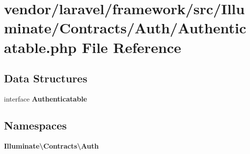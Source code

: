 \section{vendor/laravel/framework/src/\+Illuminate/\+Contracts/\+Auth/\+Authenticatable.php File Reference}
\label{_contracts_2_auth_2_authenticatable_8php}
\subsection*{Data Structures}
\begin{DoxyCompactItemize}
\item 
interface {\bf Authenticatable}
\end{DoxyCompactItemize}
\subsection*{Namespaces}
\begin{DoxyCompactItemize}
\item 
 {\bf Illuminate\textbackslash{}\+Contracts\textbackslash{}\+Auth}
\end{DoxyCompactItemize}
